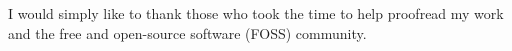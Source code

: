 
I would simply like to thank those who took the time to help proofread my work and the free and open-source software (FOSS) community.